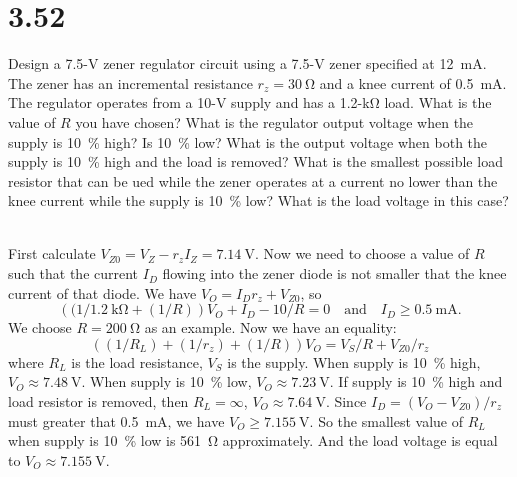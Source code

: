 \documentclass[12pt, a4paper]{article}
\theoremstyle{mystyle}	%
\newcommand{\Ans}{\noindent{\bf Ans:}}
\begin{document}
\section{3.52}
Design a 7.5-\si{\V} zener regulator circuit using a 7.5-\si{\V}
zener specified at \SI{12}{\mA}. The zener has an incremental
resistance $r_z = \SI{30}{\ohm}$ and a knee current of \SI{0.5}{\mA}.
The regulator operates from a 10-\si{\V} supply and has a
1.2-\si{\kohm} load. What is the value of $R$ you have chosen?
What is the regulator output voltage when the supply is \SI{10}{\percent}
high? Is \SI{10}{\percent} low? What is the output voltage when both the
supply is \SI{10}{\percent} high and the load is removed? What is
the smallest possible load resistor that can be ued while the zener
operates at a current no lower than the knee current while the supply
is \SI{10}{\percent} low? What is the load voltage in this case?

\Ans \\
First calculate $V_{Z0} = V_Z - r_z I_Z = \SI{7.14}{\V}$. Now we need to
choose a value of $R$ such that the current $I_D$ flowing into the zener diode
is not smaller that the knee current of that diode. We have
$V_O = I_Dr_z + V_{Z0}$, so
\[
  \left((1/\SI{1.2}{\kohm} + (1/R)\right) V_O + I_D - 10/R = 0
    \quad \text{and} \quad I_D \ge \SI{0.5}{\mA}.
\]
We choose $R = \SI{200}{\ohm}$ as an example.
Now we have an equality:
\[ \left((1/R_L) + (1/r_z) + (1/R)\right)V_O = V_S/R + V_{Z0}/r_z \]
where $R_L$ is the load resistance, $V_S$ is the supply.
When supply is \SI{10}{\percent} high, $V_O \approx \SI{7.48}{\V}$.
When supply is \SI{10}{\percent} low, $V_O \approx \SI{7.23}{\V}$.
If supply is \SI{10}{\percent} high and load resistor is removed,
then $R_L = \infty$, $V_O \approx \SI{7.64}{\V}$.
Since $I_D = (V_O - V_{Z0})/r_z$ must greater that \SI{0.5}{\mA}, we have
$V_O \ge \SI{7.155}{\V}$. So the smallest value of $R_L$ when supply is
\SI{10}{\percent} low is \SI{561}{\ohm} approximately. And the load voltage
is equal to $V_O \approx \SI{7.155}{\V}$.

\end{document}
